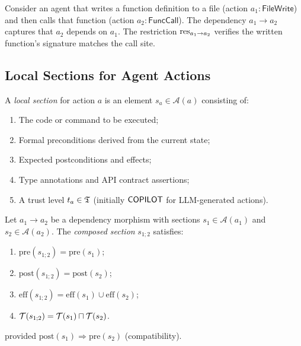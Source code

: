 \documentclass[11pt]{article}
\newcommand{\ActionSheaf}{\mathscr{A}}
\newcommand{\PreCond}{\mathrm{pre}}
\newcommand{\PostCond}{\mathrm{post}}
\newcommand{\Effect}{\mathrm{eff}}
\begin{document}
\begin{example}\label{ex:file-func}
Consider an agent that writes a function definition to a file (action
$a_1 : \mathsf{FileWrite}$) and then calls that function (action
$a_2 : \mathsf{FuncCall}$).  The dependency $a_1 \to a_2$ captures
that $a_2$ depends on $a_1$.  The restriction $\mathrm{res}_{a_1 \to a_2}$
verifies the written function's signature matches the call site.
\end{example}

\subsection{Local Sections for Agent Actions}\label{subsec:local-sections}

\begin{definition}\label{def:action-section}
A \emph{local section} for action $a$ is an element
$s_a \in \ActionSheaf(a)$ consisting of:
\begin{enumerate}[label=(\roman*)]
  \item The code or command to be executed;
  \item Formal preconditions derived from the current state;
  \item Expected postconditions and effects;
  \item Type annotations and API contract assertions;
  \item A trust level $t_a \in \mathfrak{T}$ (initially $\mathsf{COPILOT}$ for
    LLM-generated actions).
\end{enumerate}
\end{definition}

\begin{theorem}\label{thm:section-compose}
Let $a_1 \to a_2$ be a dependency morphism with sections
$s_1 \in \ActionSheaf(a_1)$ and $s_2 \in \ActionSheaf(a_2)$.
The \emph{composed section} $s_{1;2}$ satisfies:
\begin{enumerate}[label=(\roman*)]
  \item $\PreCond(s_{1;2}) = \PreCond(s_1)$;
  \item $\PostCond(s_{1;2}) = \PostCond(s_2)$;
  \item $\Effect(s_{1;2}) = \Effect(s_1) \cup \Effect(s_2)$;
  \item $\mathcal{T}(s_{1;2}) = \mathcal{T}(s_1) \sqcap \mathcal{T}(s_2)$.
\end{enumerate}
provided $\PostCond(s_1) \Rightarrow \PreCond(s_2)$ (compatibility).
\end{theorem}
\end{document}
